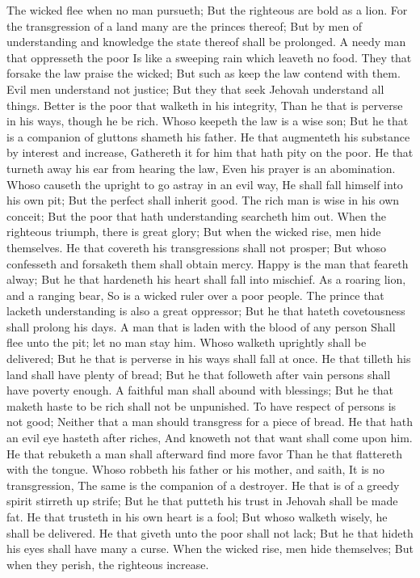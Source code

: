 The wicked flee when no man pursueth; But the righteous are bold as a lion.  For the transgression of a land many are the princes thereof; But by men of understanding and knowledge the state thereof shall be prolonged.  A needy man that oppresseth the poor Is like a sweeping rain which leaveth no food.  They that forsake the law praise the wicked; But such as keep the law contend with them.  Evil men understand not justice; But they that seek Jehovah understand all things.  Better is the poor that walketh in his integrity, Than he that is perverse in his ways, though he be rich.  Whoso keepeth the law is a wise son; But he that is a companion of gluttons shameth his father.  He that augmenteth his substance by interest and increase, Gathereth it for him that hath pity on the poor.  He that turneth away his ear from hearing the law, Even his prayer is an abomination.  Whoso causeth the upright to go astray in an evil way, He shall fall himself into his own pit; But the perfect shall inherit good.  The rich man is wise in his own conceit; But the poor that hath understanding searcheth him out.  When the righteous triumph, there is great glory; But when the wicked rise, men hide themselves.  He that covereth his transgressions shall not prosper; But whoso confesseth and forsaketh them shall obtain mercy.  Happy is the man that feareth alway; But he that hardeneth his heart shall fall into mischief.  As a roaring lion, and a ranging bear, So is a wicked ruler over a poor people.  The prince that lacketh understanding is also a great oppressor; But he that hateth covetousness shall prolong his days.  A man that is laden with the blood of any person Shall flee unto the pit; let no man stay him.  Whoso walketh uprightly shall be delivered; But he that is perverse in his ways shall fall at once.  He that tilleth his land shall have plenty of bread; But he that followeth after vain persons shall have poverty enough.  A faithful man shall abound with blessings; But he that maketh haste to be rich shall not be unpunished.  To have respect of persons is not good; Neither that a man should transgress for a piece of bread.  He that hath an evil eye hasteth after riches, And knoweth not that want shall come upon him.  He that rebuketh a man shall afterward find more favor Than he that flattereth with the tongue.  Whoso robbeth his father or his mother, and saith, It is no transgression, The same is the companion of a destroyer.  He that is of a greedy spirit stirreth up strife; But he that putteth his trust in Jehovah shall be made fat.  He that trusteth in his own heart is a fool; But whoso walketh wisely, he shall be delivered.  He that giveth unto the poor shall not lack; But he that hideth his eyes shall have many a curse.  When the wicked rise, men hide themselves; But when they perish, the righteous increase. 

